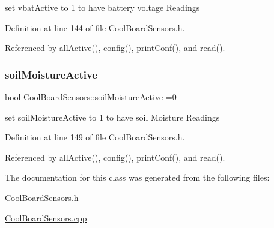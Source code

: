 set vbat\+Active to 1 to have battery voltage Readings 

Definition at line 144 of file Cool\+Board\+Sensors.\+h.



Referenced by all\+Active(), config(), print\+Conf(), and read().

\mbox{\label{class_cool_board_sensors_ae7971bf527781ac4994309591b78ab89}} 
\subsubsection{\texorpdfstring{soil\+Moisture\+Active}{soilMoistureActive}}
{\footnotesize\ttfamily bool Cool\+Board\+Sensors\+::soil\+Moisture\+Active =0\hspace{0.3cm}{\ttfamily [private]}}

set soil\+Moisture\+Active to 1 to have soil Moisture Readings 

Definition at line 149 of file Cool\+Board\+Sensors.\+h.



Referenced by all\+Active(), config(), print\+Conf(), and read().



The documentation for this class was generated from the following files\+:\begin{DoxyCompactItemize}
\item 
\hyperlink{_cool_board_sensors_8h}{Cool\+Board\+Sensors.\+h}\item 
\hyperlink{_cool_board_sensors_8cpp}{Cool\+Board\+Sensors.\+cpp}\end{DoxyCompactItemize}
